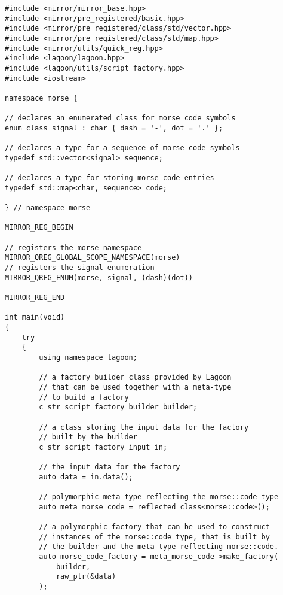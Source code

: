 \begin{verbatim}
#include <mirror/mirror_base.hpp>
#include <mirror/pre_registered/basic.hpp>
#include <mirror/pre_registered/class/std/vector.hpp>
#include <mirror/pre_registered/class/std/map.hpp>
#include <mirror/utils/quick_reg.hpp>
#include <lagoon/lagoon.hpp>
#include <lagoon/utils/script_factory.hpp>
#include <iostream>

namespace morse {

// declares an enumerated class for morse code symbols
enum class signal : char { dash = '-', dot = '.' };

// declares a type for a sequence of morse code symbols
typedef std::vector<signal> sequence;

// declares a type for storing morse code entries
typedef std::map<char, sequence> code;

} // namespace morse

MIRROR_REG_BEGIN

// registers the morse namespace
MIRROR_QREG_GLOBAL_SCOPE_NAMESPACE(morse)
// registers the signal enumeration
MIRROR_QREG_ENUM(morse, signal, (dash)(dot))

MIRROR_REG_END

int main(void)
{
    try
    {
        using namespace lagoon;

        // a factory builder class provided by Lagoon
        // that can be used together with a meta-type
        // to build a factory
        c_str_script_factory_builder builder;

        // a class storing the input data for the factory
        // built by the builder
        c_str_script_factory_input in;

        // the input data for the factory
        auto data = in.data();

        // polymorphic meta-type reflecting the morse::code type
        auto meta_morse_code = reflected_class<morse::code>();

        // a polymorphic factory that can be used to construct
        // instances of the morse::code type, that is built by
        // the builder and the meta-type reflecting morse::code.
        auto morse_code_factory = meta_morse_code->make_factory(
            builder,
            raw_ptr(&data)
        );


\end{verbatim}
